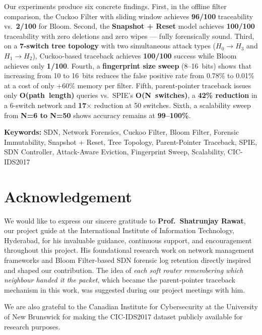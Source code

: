 \documentclass[12pt, a4paper]{report}
\begin{document}
Our experiments produce six concrete findings. First, in the offline
filter comparison, the Cuckoo Filter with sliding window achieves
\textbf{96/100} traceability vs.\ \textbf{2/100} for Bloom. Second,
the \textbf{Snapshot + Reset} model achieves \textbf{100/100}
traceability with zero deletions and zero wipes --- fully forensically
sound. Third, on a \textbf{7-switch tree topology} with two simultaneous
attack types ($H_0\!\to\!H_3$ and $H_1\!\to\!H_2$), Cuckoo-based
traceback achieves \textbf{100/100} success while Bloom achieves only
\textbf{1/100}. Fourth, a \textbf{fingerprint size sweep} (8--16~bits)
shows that increasing from 10 to 16~bits reduces the false positive rate
from 0.78\% to 0.01\% at a cost of only +60\% memory per filter.
Fifth, parent-pointer traceback issues only \textbf{O(path~length)}
queries vs.\ SPIE's \textbf{O(N~switches)}, a \textbf{42\% reduction}
in a 6-switch network and \textbf{17$\times$} reduction at 50 switches.
Sixth, a scalability sweep from \textbf{N=6 to N=50} shows accuracy
remains at \textbf{99--100\%}.

\vspace{1cm}
\noindent\textbf{Keywords:} SDN, Network Forensics, Cuckoo Filter, Bloom
Filter, Forensic Immutability, Snapshot + Reset, Tree Topology,
Parent-Pointer Traceback, SPIE, SDN Controller, Attack-Aware Eviction,
Fingerprint Sweep, Scalability, CIC-IDS2017

\newpage
\chapter*{Acknowledgement}

We would like to express our sincere gratitude to \textbf{Prof.\ Shatrunjay
Rawat}, our project guide at the International Institute of Information
Technology, Hyderabad, for his invaluable guidance, continuous support, and
encouragement throughout this project. His foundational research work on
network management frameworks and Bloom Filter-based SDN forensic log
retention directly inspired and shaped our contribution. The idea of
\textit{each soft router remembering which neighbour handed it the packet},
which became the parent-pointer traceback mechanism in this work, was
suggested during our project meetings with him.

We are also grateful to the Canadian Institute for Cybersecurity at the
University of New Brunswick for making the CIC-IDS2017 dataset publicly
available for research purposes.
\end{document}
